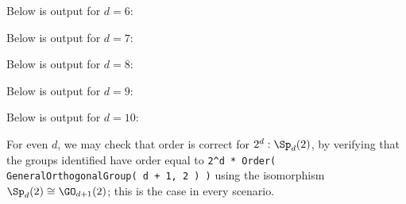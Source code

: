Below is output for $d = 6$:



Below is output for $d = 7$:



Below is output for $d = 8$:



Below is output for $d = 9$:



Below is output for $d = 10$:



For even $d$, we may check that order is correct for $2^d : \Sp_d(2)$, by verifying that the groups identified have order equal to \texttt{2\^{}d * Order( GeneralOrthogonalGroup( d + 1, 2 ) )} using the isomorphism $\Sp_d(2) \cong \GO_{d+1}(2)$; this is the case in every scenario.

% 